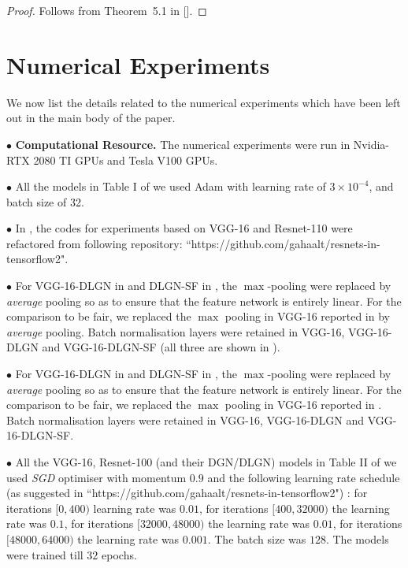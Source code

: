 \begin{proof}
Follows from Theorem~5.1 in [].
\end{proof}


\section{Numerical Experiments}\label{sec:expdetails}
We now list the details related to the numerical experiments which have been left out in the main body of the paper.

 $\bullet$ \textbf{Computational Resource.} The numerical experiments were run in Nvidia-RTX 2080 TI GPUs and Tesla V100 GPUs.

$\bullet$ All the models in Table I of  we used Adam \citep{adam} with learning rate of $3\times 10^{-4}$, and batch size of 32.

$\bullet$ In , the codes for experiments based on VGG-16 and Resnet-110  were refactored from following repository: ``https://github.com/gahaalt/resnets-in-tensorflow2".

$\bullet$ For VGG-16-DLGN in  and DLGN-SF in , the $\max$-pooling were replaced by \emph{average} pooling so as to ensure that the feature network is entirely linear. For the comparison to be fair, we replaced the $\max$ pooling in VGG-16 reported in  by \emph{average} pooling. Batch normalisation layers were retained in VGG-16, VGG-16-DLGN and VGG-16-DLGN-SF (all three are shown in ).


$\bullet$ For VGG-16-DLGN in  and DLGN-SF in , the $\max$-pooling were replaced by \emph{average} pooling so as to ensure that the feature network is entirely linear. For the comparison to be fair, we replaced the $\max$ pooling in VGG-16 reported in . Batch normalisation layers were retained in VGG-16, VGG-16-DLGN and VGG-16-DLGN-SF.

$\bullet$ All the VGG-16, Resnet-100 (and their DGN/DLGN) models in Table II of  we used \emph{SGD} optimiser with momentum $0.9$ and the following learning rate schedule (as suggested in ``https://github.com/gahaalt/resnets-in-tensorflow2") : for iterations $[0, 400)$ learning rate was $0.01$,  for iterations $[400, 32000)$ the learning rate was $ 0.1$, for iterations $[32000, 48000)$ the learning rate was $0.01$, for iterations $[48000, 64000)$ the learning rate was $0.001$. The batch size was $128$. The models were trained till $32$ epochs.

